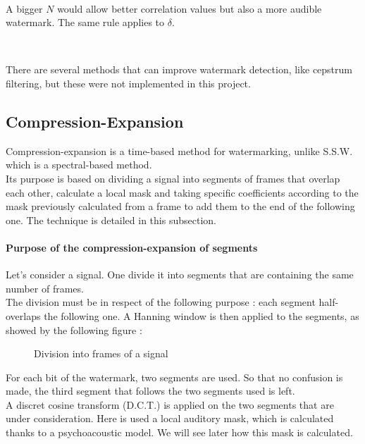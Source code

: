 ~

A bigger $N$ would allow better correlation values but also a more audible watermark. The same rule applies to $\delta$.

~

There are several methods that can improve watermark detection, like cepstrum filtering, but these were not implemented in this project.

\subsection{Compression-Expansion}\cite{foo2010}

Compression-expansion is a time-based method for watermarking, unlike S.S.W. which is a spectral-based method.\\
Its purpose is based on dividing a signal into segments of frames that overlap each other, calculate a local mask and taking specific coefficients according to the mask previously calculated from a frame to add them to the end of the following one. The technique is detailed in this subsection.

\paragraph{Purpose of the compression-expansion of segments}
Let's consider a signal. One divide it into segments that are containing the same number of frames.\\
The division must be in respect of the following purpose : each segment half-overlaps the following one. A Hanning window is then applied to the segments, as showed by the following figure :
\begin{figure}[H]
\caption{\label{frames} Division into frames of a signal}
\end{figure}
For each bit of the watermark, two segments are used. So that no confusion is made, the third segment that follows the two segments used is left.\\
A discret cosine transform (D.C.T.) is applied on the two segments that are under consideration. Here is used a local auditory mask, which is calculated thanks to a psychoacoustic model. We will see later how this mask is calculated.

